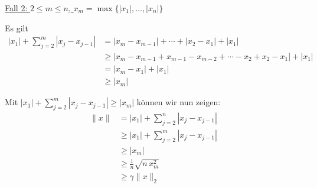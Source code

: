 \documentclass[a4paper,12pt]{article}
\begin{document}
\begin{enumerate}[label=\alph*)]
    \underline{Fall 2: $2 \leq m \leq n$, $x_m = \max\{|x_1|, \ldots, |x_n|\}$}

    Es gilt
    \begin{align*}
        |x_1| + \sum_{j=2}^{m} |x_j - x_{j-1}|
        &= |x_m - x_{m-1}| + \cdots + |x_2 - x_1| + |x_1| \\
        &\geq |x_m - x_{m-1} + x_{m-1} - x_{m-2} + \cdots - x_2 + x_2 - x_1| + |x_1| \\
        &= |x_m - x_1| + |x_1| \\
        &\geq |x_m|
    \end{align*}

    Mit $|x_1| + \sum_{j=2}^{m} |x_j - x_{j-1}| \geq |x_m|$ können wir nun zeigen:
    \begin{align*}
        \|x\| &= |x_1| + \sum_{j=2}^{n} |x_j - x_{j-1}| \\
              &\geq |x_1| + \sum_{j=2}^{m} |x_j - x_{j-1}| \\
              &\geq |x_m| \\
              &\geq \frac{1}{n} \sqrt{n \, x_m^2} \\
              &\geq \gamma \|x\|_2
    \end{align*}

\end{enumerate}
\end{document}
